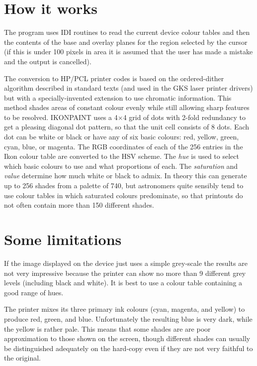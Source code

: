 \section{How it works}

The program uses IDI routines
to read the current device colour tables and then the contents
of the base and overlay planes for the region selected by the cursor (if
this is under 100 pixels in area it is assumed that the user has made a
mistake and the output is cancelled).

The conversion to HP/PCL printer codes is based on the ordered-dither
algorithm described in standard texts (and used in the GKS laser printer
drivers) but with a specially-invented extension to use chromatic
information. This method shades areas of constant colour evenly while
still allowing sharp features to be resolved. IKONPAINT uses a
4$\times$4 grid of dots with 2-fold redundancy to get a pleasing
diagonal dot pattern, so that the unit cell consists of 8 dots.  Each
dot can be white or black or have any of six basic colours: red, yellow,
green, cyan, blue, or magenta. The RGB coordinates of each of the 256
entries in the Ikon colour table are converted to the HSV scheme.  The
{\it hue} is used to select which basic colours to use and what
proportions of each.  The {\it saturation} and {\it value} determine how
much white or black to admix. In theory this can generate up to 256
shades from a palette of 740, but astronomers quite sensibly tend to use
colour tables in which saturated colours predominate, so that printouts
do not often contain more than 150 different shades.

\section{Some limitations}

If the image displayed on the device just uses a simple grey-scale
the results are not very impressive because the printer can show no more
than 9 different grey levels (including black and white).  It is best to
use a colour table containing a good range of hues.

The printer mixes its three primary ink colours (cyan, magenta, and
yellow) to produce red, green, and blue.  Unfortunately the resulting
blue is very dark, while the yellow is rather pale. This means that some
shades are are poor approximation to those shown on the screen,
though different shades can usually be distinguished adequately on the
hard-copy even if they are not very faithful to the original.

